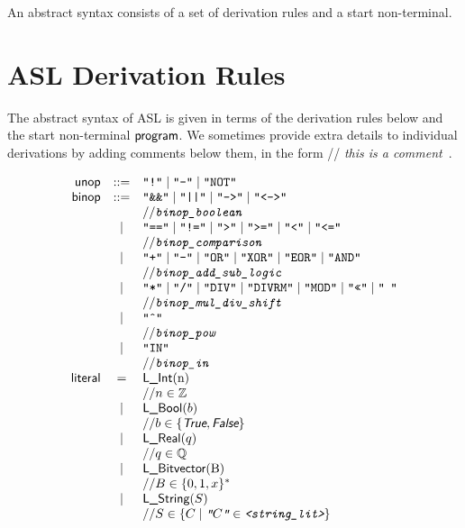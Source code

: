 \documentclass{book}
\begin{document}
An abstract syntax consists of a set of derivation rules and a start non-terminal.

\newcommand\ASTComment[1]{// \textit{#1}\ }

\section{ASL Derivation Rules}

The abstract syntax of ASL is given in terms of the derivation rules below and the start non-terminal $\textsf{program}$.
%
We sometimes provide extra details to individual derivations by adding comments below them, in the form \ASTComment{this is a comment}.

\[
\begin{array}{rcl}
\unop &::=& \texttt{"!"} \;|\; \texttt{"-"} \;|\; \texttt{"NOT"} \\
\binop &::=& \texttt{"\&\&"} \;|\; \texttt{"||"} \;|\; \texttt{"-->"} \;|\;  \texttt{"<->"}  \\
 & & \ASTComment{\texttt{binop\_boolean}}\\

 &|& \texttt{"=="} \;|\; \texttt{"!="}  \;|\; \texttt{">"}  \;|\; \texttt{">="} \;|\; \texttt{"<"} \;|\; \texttt{"<="}   \\
 & & \ASTComment{\texttt{binop\_comparison}}\\

 &|& \texttt{"+"} \;|\; \texttt{"-"}  \;|\; \texttt{"OR"}  \;|\; \texttt{"XOR"} \;|\; \texttt{"EOR"} \;|\; \texttt{"AND"}   \\
 & & \ASTComment{\texttt{binop\_add\_sub\_logic}}\\

 &|& \texttt{"*"} \;|\; \texttt{"/"}  \;|\; \texttt{"DIV"}  \;|\; \texttt{"DIVRM"} \;|\; \texttt{"MOD"}  \;|\; \texttt{"<<"}  \;|\; \texttt{"\>\>"}    \\
 & & \ASTComment{\texttt{binop\_mul\_div\_shift}}\\

 &|& \texttt{"\^{}"}   \\
 & & \ASTComment{\texttt{binop\_pow}}\\

 &|& \texttt{"IN"}   \\
 & & \ASTComment{\texttt{binop\_in}}\\

\literal &=& \lint($n$) \\
 & & \ASTComment{$n \in \Z$}\\
 &|& \lbool(b) \\
 & & \ASTComment{$b \in \{\True, \False\}$}\\
 &|& \lreal(q)  \\
 & & \ASTComment{$q \in \Q$}\\
 &|& \lbitvector($B$)   \\
 & & \ASTComment{$B \in \{0, 1, x\}^*$}\\
 &|& \lstring(S)\\
 & & \ASTComment{$S \in \{C \;|\; \texttt{"$C$"} \in \texttt{<string\_lit>}\} $}\\
\end{array}
\]
\end{document}
